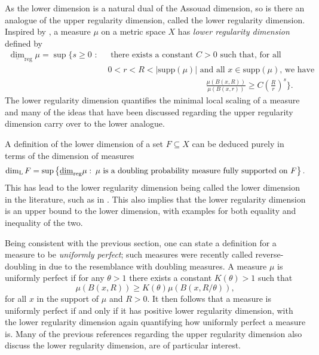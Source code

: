 As the lower dimension is a natural dual of the Assouad dimension, so is there an analogue of the upper regularity dimension, called the lower regularity dimension. Inspired by \cite{bylund-guyadol}, a measure $\mu$ on a metric space $X$ has \textit{lower regularity dimension} defined by 
\begin{align*} 
\underline{\dim}_{\text{reg}} \mu = \sup \Bigg\{ s \geq 0 \, \,  : \,  &\,\text{ there exists a  constant }C  > 0\text{  such that, for all }  \\ & \, 0< r< R < \lvert \text{supp}(\mu)    \rvert \text{  and all $x \in \text{supp} (\mu)$, we have }  \\  & \hspace{5cm} \frac{\mu(B(x,R))}{\mu(B(x,r))} \geq C\left(\frac{R}{r}\right)^{s} \Bigg\}.
\end{align*}
The lower regularity dimension quantifies the minimal local scaling of a measure and many of the ideas that have been discussed regarding the upper regularity dimension carry over to the lower analogue. 

A definition of the lower dimension of a set $F\subseteq X$ can be deduced purely in terms of the dimension of measures
\begin{equation}
    \dim_{\text{L}} F = \sup \left\{ \underline{\dim}_{\textup{reg}} \mu \,  \colon \, \mu \text{ is a doubling probability measure fully supported on } F\right\}.
\end{equation}
This has lead to the lower regularity dimension being called the lower dimension in the literature, such as in \cite{}. This also implies that the lower regularity dimension is an upper bound to the lower dimension, with examples for both equality and inequality of the two.

Being consistent with the previous section, one can state a definition for a measure to be \textit{uniformly perfect}; such measures were recently called reverse-doubling in \cite{} due to the resemblance with doubling measures. A measure $\mu$ is uniformly perfect if for any $\theta > 1$ there exists a constant $K(\theta) > 1$ such that 
\[
\mu(B(x,R)) \ge K(\theta) \mu(B(x,R/\theta)),
\]
for all $x$ in the support of $\mu$ and $R > 0$. It then follows that a measure is uniformly perfect if and only if it has positive lower regularity dimension, with the lower regularity dimension again quantifying how uniformly perfect a measure is. Many of the previous references regarding the upper regularity dimension also discuss the lower regularity dimension, \cite{some good lower reg dim papers}are  of particular interest.


